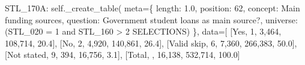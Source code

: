 \documentclass[
  11pt,
  a4paper,
]{article}
\newenvironment{Shaded}{\begin{snugshade}}{\end{snugshade}}
\newcommand{\NormalTok}[1]{\textcolor[rgb]{0.00,0.23,0.31}{#1}}
\newcommand{\OperatorTok}[1]{\textcolor[rgb]{0.37,0.37,0.37}{#1}}
\newcommand{\StringTok}[1]{\textcolor[rgb]{0.13,0.47,0.30}{#1}}
\newcommand{\VariableTok}[1]{\textcolor[rgb]{0.07,0.07,0.07}{#1}}
\begin{document}
\begin{Shaded}
\begin{Highlighting}[]
            \StringTok{\textquotesingle{}STL\_170A\textquotesingle{}}\NormalTok{: }\VariableTok{self}\NormalTok{.\_create\_table(}
\NormalTok{                meta}\OperatorTok{=}\NormalTok{\{}
                    \StringTok{\textquotesingle{}length\textquotesingle{}}\NormalTok{: }\StringTok{\textquotesingle{}1.0\textquotesingle{}}\NormalTok{, }\StringTok{\textquotesingle{}position\textquotesingle{}}\NormalTok{: }\StringTok{\textquotesingle{}62\textquotesingle{}}\NormalTok{,}
                    \StringTok{\textquotesingle{}concept\textquotesingle{}}\NormalTok{: }\StringTok{\textquotesingle{}Main funding sources\textquotesingle{}}\NormalTok{,}
                    \StringTok{\textquotesingle{}question\textquotesingle{}}\NormalTok{: }\StringTok{\textquotesingle{}Government student loans as main source?\textquotesingle{}}\NormalTok{,}
                    \StringTok{\textquotesingle{}universe\textquotesingle{}}\NormalTok{: }\StringTok{\textquotesingle{}(STL\_020 = 1 and STL\_160 \textgreater{} 2 SELECTIONS)\textquotesingle{}}
\NormalTok{                \},}
\NormalTok{                data}\OperatorTok{=}\NormalTok{[}
\NormalTok{                    [}\StringTok{\textquotesingle{}Yes\textquotesingle{}}\NormalTok{, }\StringTok{\textquotesingle{}1\textquotesingle{}}\NormalTok{, }\StringTok{\textquotesingle{}3,464\textquotesingle{}}\NormalTok{, }\StringTok{\textquotesingle{}108,714\textquotesingle{}}\NormalTok{, }\StringTok{\textquotesingle{}20.4\textquotesingle{}}\NormalTok{],}
\NormalTok{                    [}\StringTok{\textquotesingle{}No\textquotesingle{}}\NormalTok{, }\StringTok{\textquotesingle{}2\textquotesingle{}}\NormalTok{, }\StringTok{\textquotesingle{}4,920\textquotesingle{}}\NormalTok{, }\StringTok{\textquotesingle{}140,861\textquotesingle{}}\NormalTok{, }\StringTok{\textquotesingle{}26.4\textquotesingle{}}\NormalTok{],}
\NormalTok{                    [}\StringTok{\textquotesingle{}Valid skip\textquotesingle{}}\NormalTok{, }\StringTok{\textquotesingle{}6\textquotesingle{}}\NormalTok{, }\StringTok{\textquotesingle{}7,360\textquotesingle{}}\NormalTok{, }\StringTok{\textquotesingle{}266,383\textquotesingle{}}\NormalTok{, }\StringTok{\textquotesingle{}50.0\textquotesingle{}}\NormalTok{],}
\NormalTok{                    [}\StringTok{\textquotesingle{}Not stated\textquotesingle{}}\NormalTok{, }\StringTok{\textquotesingle{}9\textquotesingle{}}\NormalTok{, }\StringTok{\textquotesingle{}394\textquotesingle{}}\NormalTok{, }\StringTok{\textquotesingle{}16,756\textquotesingle{}}\NormalTok{, }\StringTok{\textquotesingle{}3.1\textquotesingle{}}\NormalTok{],}
\NormalTok{                    [}\StringTok{\textquotesingle{}Total\textquotesingle{}}\NormalTok{, }\StringTok{\textquotesingle{}\textquotesingle{}}\NormalTok{, }\StringTok{\textquotesingle{}16,138\textquotesingle{}}\NormalTok{, }\StringTok{\textquotesingle{}532,714\textquotesingle{}}\NormalTok{, }\StringTok{\textquotesingle{}100.0\textquotesingle{}}\NormalTok{]}

\end{Highlighting}
\end{Shaded}
\end{document}
